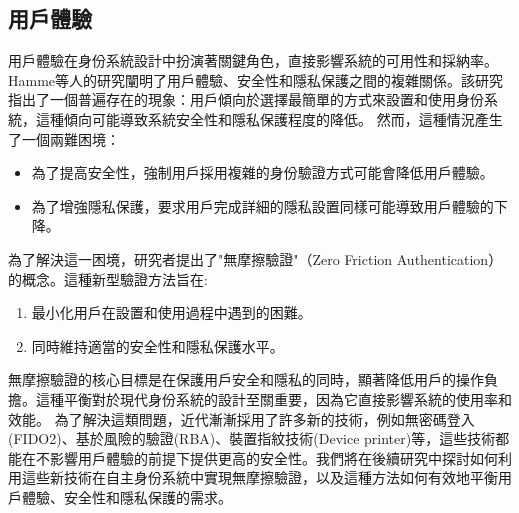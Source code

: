 \subsection{用戶體驗}
用戶體驗在身份系統設計中扮演著關鍵角色，直接影響系統的可用性和採納率。Hamme等人\cite{inproceedings}的研究闡明了用戶體驗、安全性和隱私保護之間的複雜關係。該研究指出了一個普遍存在的現象：用戶傾向於選擇最簡單的方式來設置和使用身份系統，這種傾向可能導致系統安全性和隱私保護程度的降低。\newline
然而，這種情況產生了一個兩難困境：
\begin{itemize}
  \item 為了提高安全性，強制用戶採用複雜的身份驗證方式可能會降低用戶體驗。
  \item 為了增強隱私保護，要求用戶完成詳細的隱私設置同樣可能導致用戶體驗的下降。
\end{itemize}
為了解決這一困境，研究者提出了"無摩擦驗證"（Zero Friction Authentication）的概念。這種新型驗證方法旨在:
\begin{enumerate}
  \item 最小化用戶在設置和使用過程中遇到的困難。
  \item 同時維持適當的安全性和隱私保護水平。
\end{enumerate}
無摩擦驗證的核心目標是在保護用戶安全和隱私的同時，顯著降低用戶的操作負擔。這種平衡對於現代身份系統的設計至關重要，因為它直接影響系統的使用率和效能。\newline
為了解決這類問題，近代漸漸採用了許多新的技術，例如無密碼登入(FIDO2)、基於風險的驗證(RBA)、裝置指紋技術(Device printer)等，這些技術都能在不影響用戶體驗的前提下提供更高的安全性。我們將在後續研究中探討如何利用這些新技術在自主身份系統中實現無摩擦驗證，以及這種方法如何有效地平衡用戶體驗、安全性和隱私保護的需求。
